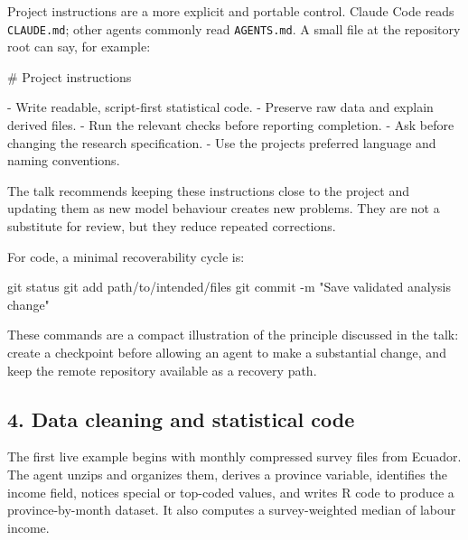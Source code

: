 \documentclass[
  english,
  10pt,
]{article}
\newenvironment{Shaded}{\begin{snugshade}}{\end{snugshade}}
\newcommand{\AttributeTok}[1]{\textcolor[rgb]{0.40,0.45,0.13}{#1}}
\newcommand{\FunctionTok}[1]{\textcolor[rgb]{0.28,0.35,0.67}{#1}}
\newcommand{\NormalTok}[1]{\textcolor[rgb]{0.00,0.23,0.31}{#1}}
\newcommand{\SpecialStringTok}[1]{\textcolor[rgb]{0.13,0.47,0.30}{#1}}
\newcommand{\StringTok}[1]{\textcolor[rgb]{0.13,0.47,0.30}{#1}}
\begin{document}
Project instructions are a more explicit and portable control. Claude
Code reads \texttt{CLAUDE.md}; other agents commonly read
\texttt{AGENTS.md}. A small file at the repository root can say, for
example:

\begin{Shaded}
\begin{Highlighting}[]
\FunctionTok{\# Project instructions}

\SpecialStringTok{{-} }\NormalTok{Write readable, script{-}first statistical code.}
\SpecialStringTok{{-} }\NormalTok{Preserve raw data and explain derived files.}
\SpecialStringTok{{-} }\NormalTok{Run the relevant checks before reporting completion.}
\SpecialStringTok{{-} }\NormalTok{Ask before changing the research specification.}
\SpecialStringTok{{-} }\NormalTok{Use the project\textquotesingle{}s preferred language and naming conventions.}
\end{Highlighting}
\end{Shaded}

The talk recommends keeping these instructions close to the project and
updating them as new model behaviour creates new problems. They are not
a substitute for review, but they reduce repeated corrections.

For code, a minimal recoverability cycle is:

\begin{Shaded}
\begin{Highlighting}[]
\FunctionTok{git}\NormalTok{ status}
\FunctionTok{git}\NormalTok{ add path/to/intended/files}
\FunctionTok{git}\NormalTok{ commit }\AttributeTok{{-}m} \StringTok{"Save validated analysis change"}
\end{Highlighting}
\end{Shaded}

These commands are a compact illustration of the principle discussed in
the talk: create a checkpoint before allowing an agent to make a
substantial change, and keep the remote repository available as a
recovery path.

\subsection{4. Data cleaning and statistical
code}\label{data-cleaning-and-statistical-code}

The first live example begins with monthly compressed survey files from
Ecuador. The agent unzips and organizes them, derives a province
variable, identifies the income field, notices special or top-coded
values, and writes R code to produce a province-by-month dataset. It
also computes a survey-weighted median of labour income.
\end{document}
